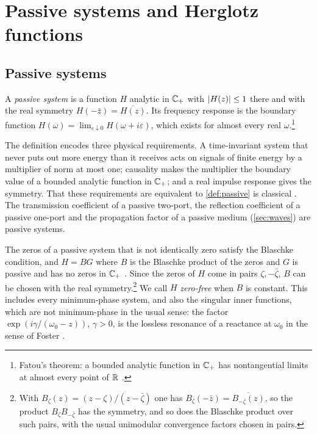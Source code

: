 \section{Passive systems and Herglotz functions}\label{sec:passive}

\subsection{Passive systems}

\begin{definition}\label{def:passive}
A \emph{passive system} is a function $H$ analytic in $\mathbb C_{+}$ with
$\left|H(z)\right|\le1$ there and with the real symmetry
$H(-\bar z)=\overline{H(z)}$. Its frequency response is the boundary
function $H(\omega)=\lim_{\varepsilon\downarrow0}H(\omega+i\varepsilon)$,
which exists for almost every real $\omega$.\footnote{Fatou's theorem: a bounded analytic function in $\mathbb C_{+}$ has nontangential limits at almost every point of $\mathbb R$ \cite[Ch.~I]{garnett}.}
\end{definition}

The definition encodes three physical requirements. A time-invariant
system that never puts out more energy than it receives acts on signals of
finite energy by a multiplier of norm at most one; causality makes the
multiplier the boundary value of a bounded analytic function in $\mathbb C_{+}$; and a
real impulse response gives the symmetry. That these requirements are
equivalent to \cref{def:passive} is classical \cite{toll,nussenzveig,garnett}.
The transmission coefficient of a passive two-port, the reflection
coefficient of a passive one-port and the propagation factor of a passive
medium (\cref{sec:waves}) are passive systems.

The zeros of a passive system that is not identically zero satisfy the
Blaschke condition, and $H=BG$ where $B$ is the Blaschke product of the
zeros and $G$ is passive and has no zeros in $\mathbb C_{+}$ \cite[Ch.~II]{garnett}.
Since the zeros of $H$ come in pairs $\zeta,-\bar\zeta$, $B$ can be chosen
with the real symmetry.\footnote{With $B_\zeta(z)=(z-\zeta)/(z-\bar\zeta)$ one has $B_\zeta(-\bar z)=\overline{B_{-\bar\zeta}(z)}$, so the product $B_\zeta B_{-\bar\zeta}$ has the symmetry, and so does the Blaschke product over such pairs, with the usual unimodular convergence factors chosen in pairs.} We call $H$ \emph{zero-free} when $B$ is constant.
This includes every minimum-phase system, and also the singular inner
functions, which are not minimum-phase in the usual sense: the factor
$\exp(i\gamma/(\omega_0-z))$, $\gamma>0$, is the lossless resonance of a
reactance at $\omega_0$ in the sense of Foster \cite{foster}.

